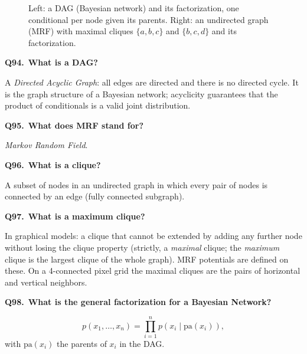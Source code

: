\documentclass[11pt,a4paper]{article}
\newcommand{\keep}[1]{\par
  \ifdim\dimexpr\pagegoal-\pagetotal\relax<#1\relax\newpage\fi}
\newcommand{\q}[2]{\keep{2.5cm}\medskip
  {\sffamily\bfseries\color{questc}Q#1.}\ {\sffamily\bfseries #2}\par}
\begin{document}
\begin{figure}[ht]
\centering
{}
\caption{Left: a DAG (Bayesian network) and its factorization, one conditional
per node given its parents. Right: an undirected graph (MRF) with maximal cliques
$\{a,b,c\}$ and $\{b,c,d\}$ and its factorization.}
\end{figure}

\q{94}{What is a DAG?}
A \emph{Directed Acyclic Graph}: all edges are directed and there is no directed
cycle. It is the graph structure of a Bayesian network; acyclicity guarantees
that the product of conditionals is a valid joint distribution.

\q{95}{What does MRF stand for?}
\emph{Markov Random Field}.

\q{96}{What is a clique?}
A subset of nodes in an undirected graph in which every pair of nodes is
connected by an edge (fully connected subgraph).

\q{97}{What is a maximum clique?}
In graphical models: a clique that cannot be extended by adding any further
node without losing the clique property (strictly, a \emph{maximal} clique; the
\emph{maximum} clique is the largest clique of the whole graph). MRF potentials
are defined on these. On a 4-connected pixel grid the maximal cliques are the
pairs of horizontal and vertical neighbors.

\q{98}{What is the general factorization for a Bayesian Network?}
\[
  p(x_1,\dots,x_n) = \prod_{i=1}^n p(x_i\mid\text{pa}(x_i)),
\]
\noindent
with $\text{pa}(x_i)$ the parents of $x_i$ in the DAG.
\end{document}
